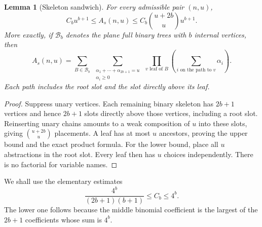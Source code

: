 \documentclass[11pt,a4paper]{article}
\numberwithin{equation}{section}
\newtheorem{lemma}[theorem]{Lemma}
\theoremstyle{remark}
\begin{document}
\begin{lemma}[Skeleton sandwich]\label{lam:bg:lem:skeleton}
For every admissible pair $(n,u)$,
\begin{equation}\label{lam:bg:eq:sandwich}
 C_bu^{b+1}\le A_s(n,u)
       \le C_b\binom{u+2b}{u}u^{b+1}.
\end{equation}
More exactly, if $\mathcal B_b$ denotes the plane full binary trees with $b$ internal vertices, then
\begin{equation}\label{lam:bg:eq:exact-weight}
 A_s(n,u)=\sum_{B\in\mathcal B_b}
 \ \sum_{\substack{\alpha_1+\cdots+\alpha_{2b+1}=u\\\alpha_i\ge0}}
 \ \prod_{v\text{ leaf of }B}\left(\sum_{i\text{ on the path to }v}\alpha_i\right).
\end{equation}
Each path includes the root slot and the slot directly above its leaf.
\end{lemma}
\begin{proof}
Suppress unary vertices. Each remaining binary skeleton has $2b+1$ vertices and hence $2b+1$ slots directly above those vertices, including a root slot. Reinserting unary chains amounts to a weak composition of $u$ into these slots, giving $\binom{u+2b}{u}$ placements. A leaf has at most $u$ ancestors, proving the upper bound and the exact product formula. For the lower bound, place all $u$ abstractions in the root slot. Every leaf then has $u$ choices independently. There is no factorial for variable names.
\end{proof}
We shall use the elementary estimates
\begin{equation}\label{lam:bg:eq:catalan-bounds}
 \frac{4^b}{(2b+1)(b+1)}\le C_b\le4^b.
\end{equation}
The lower one follows because the middle binomial coefficient is the largest of the $2b+1$ coefficients whose sum is $4^b$.
\end{document}
